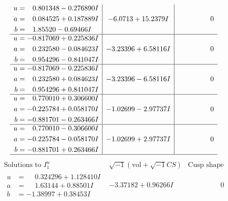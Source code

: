 \documentclass[1p]{elsarticle_modified}
\theoremstyle{definition}
\newcommand{\I}{\sqrt{-1}}
\begin{document}
$$\begin{array}{c|c|c}
\begin{aligned}
u &= \phantom{-}0.801348 - 0.276890 I \\
a &= \phantom{-}0.084525 + 0.187889 I \\
b &= \phantom{-}1.85520 - 0.69466 I\end{aligned}
 & -6.0713 + 15.2379 I & \phantom{-0.000000 } 0 \\ \hline\begin{aligned}
u &= -0.817069 + 0.225836 I \\
a &= \phantom{-}0.232580 - 0.084623 I \\
b &= \phantom{-}0.954296 - 0.841047 I\end{aligned}
 & -3.23396 + 6.58116 I & \phantom{-0.000000 } 0 \\ \hline\begin{aligned}
u &= -0.817069 - 0.225836 I \\
a &= \phantom{-}0.232580 + 0.084623 I \\
b &= \phantom{-}0.954296 + 0.841047 I\end{aligned}
 & -3.23396 - 6.58116 I & \phantom{-0.000000 } 0 \\ \hline\begin{aligned}
u &= \phantom{-}0.770010 + 0.306600 I \\
a &= -0.225784 + 0.058170 I \\
b &= -0.881701 - 0.263466 I\end{aligned}
 & -1.02699 - 2.97737 I & \phantom{-0.000000 } 0 \\ \hline\begin{aligned}
u &= \phantom{-}0.770010 - 0.306600 I \\
a &= -0.225784 - 0.058170 I \\
b &= -0.881701 + 0.263466 I\end{aligned}
 & -1.02699 + 2.97737 I & \phantom{-0.000000 } 0\\
 \hline 
 \end{array}$$\newpage$$\begin{array}{c|c|c}  
\text{Solutions to }I^u_{1}& \I (\text{vol} + \sqrt{-1}CS) & \text{Cusp shape}\\
 \hline 
\begin{aligned}
u &= \phantom{-}0.324296 + 1.128410 I \\
a &= \phantom{-}1.63144 + 0.88501 I \\
b &= -1.38997 + 0.38453 I\end{aligned}
 & -3.37182 + 0.96266 I & \phantom{-0.000000 } 0 \\ \hline\begin{aligned}

\end{aligned}
\end{array}$$
\end{document}
